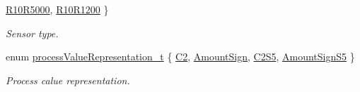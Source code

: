 \begin{DoxyCompactItemize}
\hyperlink{classmdt_device_modbus_wago_module_rtd_a3ef847ef5be945559be1271e15905fb0a0690048c3a5da4a12499c19f41796411}{R10\-R5000}, 
\hyperlink{classmdt_device_modbus_wago_module_rtd_a3ef847ef5be945559be1271e15905fb0a49dced9911f2b03c950071afcdb1e30f}{R10\-R1200}
 \}
\begin{DoxyCompactList}\small\item\em Sensor type. \end{DoxyCompactList}\item 
enum \hyperlink{classmdt_device_modbus_wago_module_rtd_a6edcc72b85641ca88d66ca45a7650ca8}{process\-Value\-Representation\-\_\-t} \{ \hyperlink{classmdt_device_modbus_wago_module_rtd_a6edcc72b85641ca88d66ca45a7650ca8a46b618df5f4f98c2284b015c76e2d5b6}{C2}, 
\hyperlink{classmdt_device_modbus_wago_module_rtd_a6edcc72b85641ca88d66ca45a7650ca8a2dbc0577b6cee124301b6f3d35240a42}{Amount\-Sign}, 
\hyperlink{classmdt_device_modbus_wago_module_rtd_a6edcc72b85641ca88d66ca45a7650ca8ae19394d1163ada7da4f546e64468df76}{C2\-S5}, 
\hyperlink{classmdt_device_modbus_wago_module_rtd_a6edcc72b85641ca88d66ca45a7650ca8abb5c362af8e7317be54a4346e0915d13}{Amount\-Sign\-S5}
 \}
\begin{DoxyCompactList}\small\item\em Process calue representation. \end{DoxyCompactList}\end{DoxyCompactItemize}

